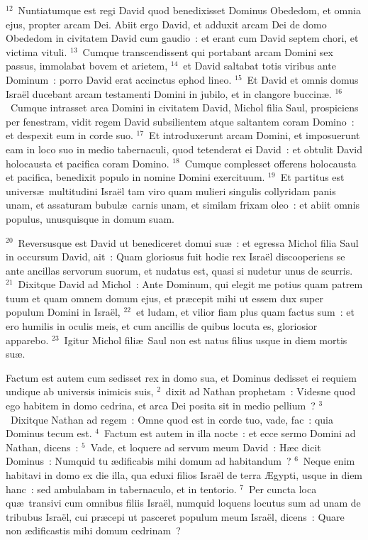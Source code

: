 ${}^{12}$~Nuntiatumque est regi David quod benedixisset Dominus Obededom, et omnia ejus, propter arcam Dei. Abiit ergo David, et adduxit arcam Dei de domo Obededom in civitatem David cum gaudio~: et erant cum David septem chori, et victima vituli.
${}^{13}$~Cumque transcendissent qui portabant arcam Domini sex passus, immolabat bovem et arietem,
${}^{14}$~et David saltabat totis viribus ante Dominum~: porro David erat accinctus ephod lineo.
${}^{15}$~Et David et omnis domus Isra\"el ducebant arcam testamenti Domini in jubilo, et in clangore buccin\ae .
${}^{16}$~Cumque intrasset arca Domini in civitatem David, Michol filia Saul, prospiciens per fenestram, vidit regem David subsilientem atque saltantem coram Domino~: et despexit eum in corde suo.
${}^{17}$~Et introduxerunt arcam Domini, et imposuerunt eam in loco suo in medio tabernaculi, quod tetenderat ei David~: et obtulit David holocausta et pacifica coram Domino.
${}^{18}$~Cumque complesset offerens holocausta et pacifica, benedixit populo in nomine Domini exercituum.
${}^{19}$~Et partitus est univers\ae\ multitudini Isra\"el tam viro quam mulieri singulis collyridam panis unam, et assaturam bubul\ae\ carnis unam, et similam frixam oleo~: et abiit omnis populus, unusquisque in domum suam.


${}^{20}$~Reversusque est David ut benediceret domui su\ae~: et egressa Michol filia Saul in occursum David, ait~: Quam gloriosus fuit hodie rex Isra\"el discooperiens se ante ancillas servorum suorum, et nudatus est, quasi si nudetur unus de scurris.
${}^{21}$~Dixitque David ad Michol~: Ante Dominum, qui elegit me potius quam patrem tuum et quam omnem domum ejus, et pr\ae cepit mihi ut essem dux super populum Domini in Isra\"el,
${}^{22}$~et ludam, et vilior fiam plus quam factus sum~: et ero humilis in oculis meis, et cum ancillis de quibus locuta es, gloriosior apparebo.
${}^{23}$~Igitur Michol fili\ae\ Saul non est natus filius usque in diem mortis su\ae .

\lettrine[lines=3,image=true,loversize=0.05,lraise=-0.03]{F}{}actum est autem cum sedisset rex in domo sua, et Dominus dedisset ei requiem undique ab universis inimicis suis,
${}^{2}$~dixit ad Nathan prophetam~: Videsne quod ego habitem in domo cedrina, et arca Dei posita sit in medio pellium~?
${}^{3}$~Dixitque Nathan ad regem~: Omne quod est in corde tuo, vade, fac~: quia Dominus tecum est.
${}^{4}$~Factum est autem in illa nocte~: et ecce sermo Domini ad Nathan, dicens~:
${}^{5}$~Vade, et loquere ad servum meum David~: H\ae c dicit Dominus~: Numquid tu \ae dificabis mihi domum ad habitandum~?
${}^{6}$~Neque enim habitavi in domo ex die illa, qua eduxi filios Isra\"el de terra \AE gypti, usque in diem hanc~: sed ambulabam in tabernaculo, et in tentorio.
${}^{7}$~Per cuncta loca qu\ae\ transivi cum omnibus filiis Isra\"el, numquid loquens locutus sum ad unam de tribubus Isra\"el, cui pr\ae cepi ut pasceret populum meum Isra\"el, dicens~: Quare non \ae dificastis mihi domum cedrinam~?


